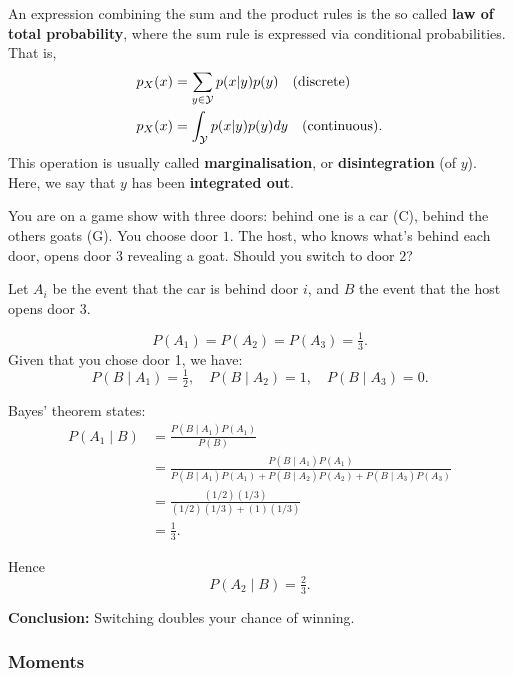 An expression combining the sum and the product rules is the so called \textbf{law of total probability}, where the sum rule is expressed via conditional probabilities. That is,   
\begin{align}
		p_X(x) &=  \sum_{y\in{\mathcal Y}}p(x|y)p(y)\quad \text{(discrete)}\\
	p_X(x) &=  \int_{{\mathcal Y}}p(x|y)p(y)dy\quad \text{(continuous)}.
\end{align}
This operation is usually called \textbf{marginalisation}, or \textbf{disintegration} (of $y$). Here, we say that $y$ has been \textbf{integrated out}.



\begin{example}

You are on a game show with three doors: behind one is a car (C), behind the others goats (G).  
You choose door $1$. The host, who knows what’s behind each door, opens door $3$ revealing a goat.  
Should you switch to door $2$?

\medskip
Let $A_i$ be the event that the car is behind door $i$, and $B$ the event that the host opens door $3$.

\[
P(A_1)=P(A_2)=P(A_3)=\tfrac{1}{3}.
\]
Given that you chose door 1, we have:
\[
P(B \mid A_1)=\tfrac{1}{2}, \quad P(B \mid A_2)=1, \quad P(B \mid A_3)=0.
\]

Bayes’ theorem states:
\begin{align}
	P(A_1 \mid B)
	& = \frac{P(B \mid A_1) P(A_1)}{P(B)}\\
	& = \frac{P(B \mid A_1) P(A_1)}{P(B \mid A_1)P(A_1) + P(B \mid A_2)P(A_2) + P(B \mid A_3)P(A_3)}\\
	& = \frac{(1/2)(1/3)}{(1/2)(1/3) + (1)(1/3)}\\
	& = \frac{1}{3}.	
\end{align}



Hence
\[
P(A_2 \mid B) = \tfrac{2}{3}.
\]

\textbf{Conclusion:} Switching doubles your chance of winning.


\end{example}

\subsubsection{Moments}
\label{cap:prob_moments}



